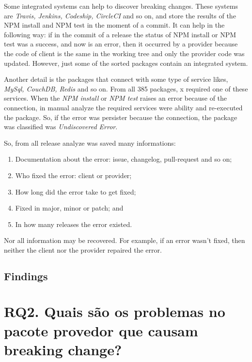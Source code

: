 Some integrated systems can help to discover breaking changes. These systems are \textit{Travis, Jenkins, Codeship, CircleCI} and so on, and store the results of the \Gls{NPM} install and \Gls{NPM} test in the moment of a commit. It can help in the following way: if in the commit of a release the status of \Gls{NPM} install or \Gls{NPM} test was a success, and now is an error, then it occurred by a provider because the code of client is the same in the working tree and only the provider code was updated. However, just some of the sorted packages contain an integrated system.

Another detail is the packages that connect with some type of service likes, \textit{MySql, CouchDB, Redis} and so on. From all 385 packages, x required one of these services. When the \textit{\Gls{NPM} install} or \textit{\Gls{NPM} test} raises an error because of the connection, in manual analyze the required services were ability and re-executed the package. So, if the error was persister because the connection, the package was classified was \textit{Undiscovered Error}.

So, from all release analyze was saved many informations:

\begin{enumerate}
    \item Documentation about the error: issue, changelog, pull-request and so on;
    \item Who fixed the error: client or provider;
    \item How long did the error take to get fixed;
    \item Fixed in major, minor or patch; and
    \item In how many releases the error existed.
\end{enumerate}{}

Nor all information may be recovered. For example, if an error wasn't fixed, then neither the client nor the provider repaired the error.

\subsection{Findings}
\label{fin:rq1}

\section{RQ2. Quais são os problemas no pacote provedor que causam breaking change?}
\label{sec:rq2}

